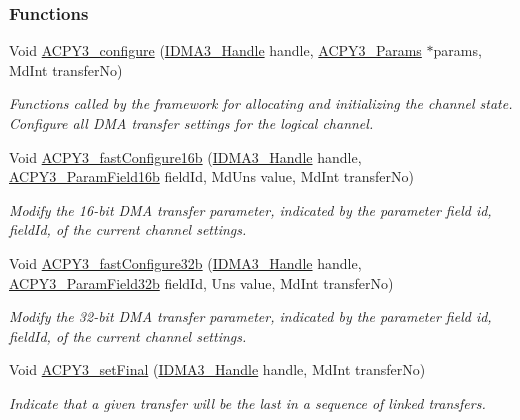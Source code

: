 \subsubsection*{Functions}
\begin{CompactItemize}
\item 
Void \hyperlink{group___d_s_p_a_c_p_y3_g427e8e4fd5c445b2f9bb5d971c06c099}{ACPY3\_\-configure} (\hyperlink{struct_i_d_m_a3___obj}{IDMA3\_\-Handle} handle, \hyperlink{struct_a_c_p_y3___params}{ACPY3\_\-Params} $\ast$params, Md\-Int transfer\-No)
\begin{CompactList}\small\item\em Functions called by the framework for allocating and initializing the channel state. Configure all DMA transfer settings for the logical channel. \item\end{CompactList}\item 
Void \hyperlink{group___d_s_p_a_c_p_y3_g2c54ca4dc3d0cf3f861259bc7cf0f8de}{ACPY3\_\-fast\-Configure16b} (\hyperlink{struct_i_d_m_a3___obj}{IDMA3\_\-Handle} handle, \hyperlink{group___d_s_p_a_c_p_y3_gf9624d3d925ec0d15bd845967664e608}{ACPY3\_\-Param\-Field16b} field\-Id, Md\-Uns value, Md\-Int transfer\-No)
\begin{CompactList}\small\item\em Modify the 16-bit DMA transfer parameter, indicated by the parameter field id, field\-Id, of the current channel settings. \item\end{CompactList}\item 
Void \hyperlink{group___d_s_p_a_c_p_y3_g2ad7ed5dc554a991c4c11f644f5a8272}{ACPY3\_\-fast\-Configure32b} (\hyperlink{struct_i_d_m_a3___obj}{IDMA3\_\-Handle} handle, \hyperlink{group___d_s_p_a_c_p_y3_g96f43d4bc010da2d1bb9dc08ea828de0}{ACPY3\_\-Param\-Field32b} field\-Id, Uns value, Md\-Int transfer\-No)
\begin{CompactList}\small\item\em Modify the 32-bit DMA transfer parameter, indicated by the parameter field id, field\-Id, of the current channel settings. \item\end{CompactList}\item 
Void \hyperlink{group___d_s_p_a_c_p_y3_gfc7ddb15d68ef3741abfb8843763fce5}{ACPY3\_\-set\-Final} (\hyperlink{struct_i_d_m_a3___obj}{IDMA3\_\-Handle} handle, Md\-Int transfer\-No)
\begin{CompactList}\small\item\em Indicate that a given transfer will be the last in a sequence of linked transfers. \item\end{CompactList}\item 

\end{CompactItemize}
